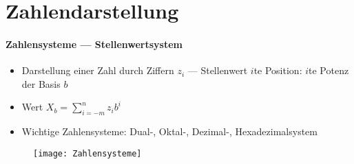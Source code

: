 \section{Zahlendarstellung}
\label{sec:zahlendarstellung}

\paragraph{Zahlensysteme --- Stellenwertsystem}
\begin{itemize}
	\item Darstellung einer Zahl durch Ziffern $z_i$ --- Stellenwert $i$te Position: $i$te Potenz der Basis $b$
	\item Wert $X_b = \sum _{i=-m}^n z_ib^i$
	\item Wichtige Zahlensysteme: Dual-, Oktal-, Dezimal-, Hexadezimalsystem
\end{itemize}
\begin{figure}[ht]
  \centering
  \texttt{[image: Zahlensysteme]}
  \label{Zahlensysteme}
\end{figure}

